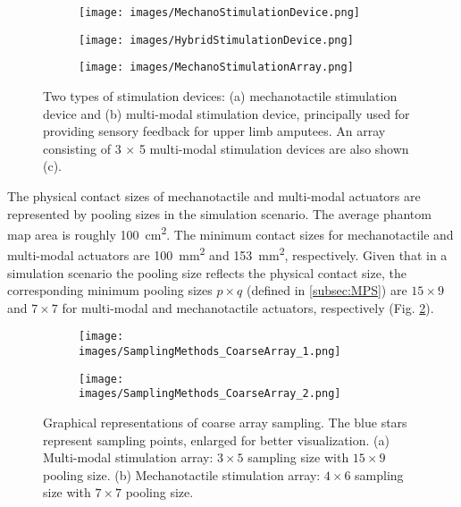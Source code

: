 \begin{figure}[htbp]
    \centering
    \begin{subfigure}[b]{0.3\textwidth}
        \texttt{[image: images/MechanoStimulationDevice.png]}
        \caption{}
    \end{subfigure}
    \hspace{0.1cm}
    \begin{subfigure}[b]{0.3\textwidth}
        \texttt{[image: images/HybridStimulationDevice.png]}
        \caption{}
    \end{subfigure}
    \begin{subfigure}[b]{0.3\textwidth}
        \texttt{[image: images/MechanoStimulationArray.png]}
        \caption{}
    \end{subfigure}    
    \caption{Two types of stimulation devices: (a) mechanotactile stimulation device and (b) multi-modal stimulation device, principally used for providing sensory feedback for upper limb amputees. An array consisting of 3 $\times$ 5 multi-modal stimulation devices are also shown (c).}
    \label{fig:StimulationDevice}
\end{figure} 

The physical contact sizes of mechanotactile and multi-modal actuators are represented by pooling sizes in the simulation scenario. 
The average phantom map area is roughly \SI{100}{cm^2}. The minimum contact sizes for mechanotactile and multi-modal actuators are \SI{100}{mm^2} and \SI{153}{mm^2}, respectively. Given that in a simulation scenario the pooling size reflects the physical contact size, the corresponding minimum pooling sizes $p \times q$ (defined in \ref{subsec:MPS}) are $15 \times 9$ and $7 \times 7$ for multi-modal and mechanotactile actuators, respectively (Fig. \ref{fig:ExamplesCoarseArray_sampling}). 

\begin{figure}[hb]
    \centering
    \begin{subfigure}[b]{0.34\textwidth}
        \texttt{[image: images/SamplingMethods\_CoarseArray\_1.png]}
        \caption{}
    \end{subfigure}
    \hspace{0.1cm}
    \begin{subfigure}[b]{0.34\textwidth}
        \texttt{[image: images/SamplingMethods\_CoarseArray\_2.png]}
        \caption{}
    \end{subfigure}
    \caption{Graphical representations of coarse array sampling. The blue stars represent sampling points, enlarged for better visualization. (a) Multi-modal stimulation array: $3 \times 5$ sampling size with $15 \times 9$ pooling size. (b) Mechanotactile stimulation array: $4 \times 6$ sampling size with $7 \times 7$ pooling size.}
    \label{fig:ExamplesCoarseArray_sampling}
\end{figure} 



